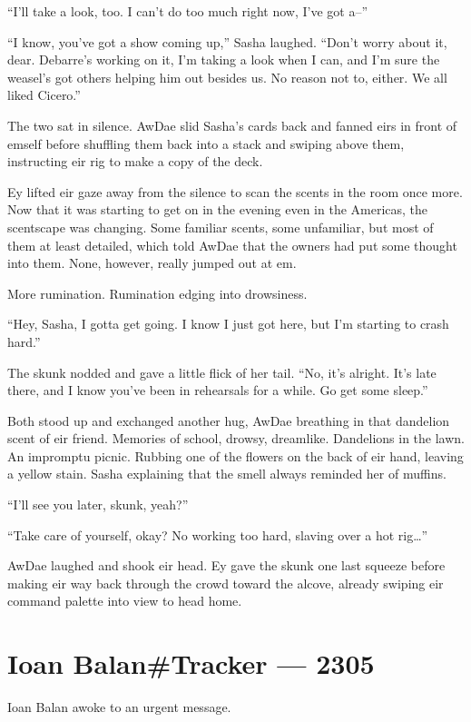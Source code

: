 ``I'll take a look, too. I can't do too much right now, I've got a--''

``I know, you've got a show coming up,'' Sasha laughed. ``Don't worry about it, dear. Debarre's working on it, I'm taking a look when I can, and I'm sure the weasel's got others helping him out besides us. No reason not to, either. We all liked Cicero.''

The two sat in silence. AwDae slid Sasha's cards back and fanned eirs in front of emself before shuffling them back into a stack and swiping above them, instructing eir rig to make a copy of the deck.

Ey lifted eir gaze away from the silence to scan the scents in the room once more. Now that it was starting to get on in the evening even in the Americas, the scentscape was changing. Some familiar scents, some unfamiliar, but most of them at least detailed, which told AwDae that the owners had put some thought into them. None, however, really jumped out at em.

More rumination. Rumination edging into drowsiness.

``Hey, Sasha, I gotta get going. I know I just got here, but I'm starting to crash hard.''

The skunk nodded and gave a little flick of her tail. ``No, it's alright. It's late there, and I know you've been in rehearsals for a while. Go get some sleep.''

Both stood up and exchanged another hug, AwDae breathing in that dandelion scent of eir friend. Memories of school, drowsy, dreamlike. Dandelions in the lawn. An impromptu picnic. Rubbing one of the flowers on the back of eir hand, leaving a yellow stain. Sasha explaining that the smell always reminded her of muffins.

``I'll see you later, skunk, yeah?''

``Take care of yourself, okay? No working too hard, slaving over a hot rig\ldots{}''

AwDae laughed and shook eir head. Ey gave the skunk one last squeeze before making eir way back through the crowd toward the alcove, already swiping eir command palette into view to head home.

\chapter*{Ioan Balan\#Tracker — 2305}

Ioan Balan awoke to an urgent message.

